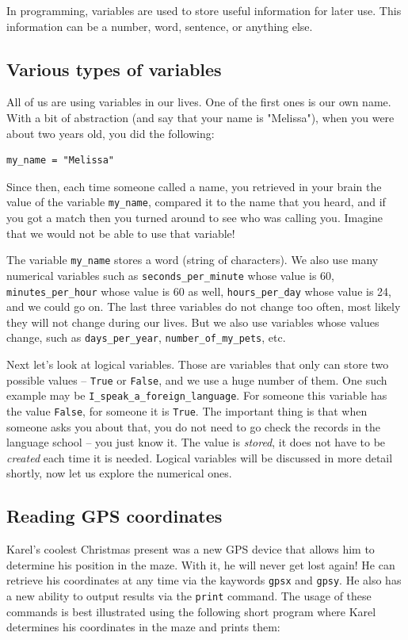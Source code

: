 \noindent
In programming, variables are used to store useful information for later use. This information can 
be a number, word, sentence, or anything else. 

\subsection{Various types of variables}

All of us are using variables in our lives. One of 
the first ones is our own name. With a bit of abstraction (and say that your name is "Melissa"), 
when you were about two years old, you did the following:

\begin{verbatim}
my_name = "Melissa"
\end{verbatim}
Since then, each time someone called a name, you retrieved in your brain the value of the variable
{\tt my\_name}, compared it to the name that you heard, and if you got a match then you turned around 
to see who was calling you. Imagine that we would not be able to use that variable!

The variable {\tt my\_name} stores a word (string of characters). We also use many numerical variables such as
{\tt seconds\_per\_minute} whose value is 60, {\tt minutes\_per\_hour} whose value is 60 as well, 
{\tt hours\_per\_day} whose value is 24, and we could go on. The last three variables do not change 
too often, most likely they will not change during our lives. But we also use variables whose 
values change, such as {\tt days\_per\_year}, {\tt number\_of\_my\_pets}, etc.

Next let's look at logical variables. Those are variables that only can store two possible values --
{\tt True} or {\tt False}, and we use a huge number of them. One such example may be {\tt I\_speak\_a\_foreign\_language}.
For someone this variable has the value {\tt False}, for someone it is {\tt True}. The important 
thing is that when someone asks you about that, you do not need to go check the records in the language 
school -- you just know it. The value is {\em stored}, it does not have to be {\em created} each time 
it is needed. Logical variables will be discussed in more detail shortly, now let us explore 
the numerical ones.

\subsection{Reading GPS coordinates}

Karel's coolest Christmas present was a new GPS device that allows him to determine his position 
in the maze. With it, he will never get lost again! He can retrieve his coordinates at any time via the 
kaywords {\tt gpsx} and {\tt gpsy}. He also has a new ability to output results via the {\tt print} 
command. The usage of these commands is best illustrated using the following short program where 
Karel determines his coordinates in the maze and prints them:

